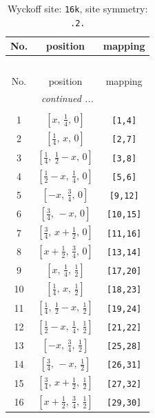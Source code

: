 \documentclass[fleqn,8pt]{jsarticle}
\begin{document}
\renewcommand{\arraystretch}{1.2}
\begin{longtable}{ccc}
\caption{Wyckoff site: {\tt 16k}, site symmetry: {\tt .2.}}
 \\
 \hline \hline
No. & position & mapping \\ \hline \endfirsthead

\multicolumn{2}{l}{\tablename\ \thetable{}} \\
 \hline \hline
No. & position & mapping \\ \hline \endhead

 \hline \hline
\multicolumn{2}{r}{\footnotesize\it continued ...} \\ \endfoot

 \hline \hline
\multicolumn{2}{r}{} \\ \endlastfoot

1 & $\left[ x,\, \frac{1}{4},\, 0 \right]$ & {\tt [1,4]} \\ \hline
2 & $\left[ \frac{1}{4},\, x,\, 0 \right]$ & {\tt [2,7]} \\ \hline
3 & $\left[ \frac{1}{4},\, \frac{1}{2} - x,\, 0 \right]$ & {\tt [3,8]} \\ \hline
4 & $\left[ \frac{1}{2} - x,\, \frac{1}{4},\, 0 \right]$ & {\tt [5,6]} \\ \hline
5 & $\left[ - x,\, \frac{3}{4},\, 0 \right]$ & {\tt [9,12]} \\ \hline
6 & $\left[ \frac{3}{4},\, - x,\, 0 \right]$ & {\tt [10,15]} \\ \hline
7 & $\left[ \frac{3}{4},\, x + \frac{1}{2},\, 0 \right]$ & {\tt [11,16]} \\ \hline
8 & $\left[ x + \frac{1}{2},\, \frac{3}{4},\, 0 \right]$ & {\tt [13,14]} \\ \hline
9 & $\left[ x,\, \frac{1}{4},\, \frac{1}{2} \right]$ & {\tt [17,20]} \\ \hline
10 & $\left[ \frac{1}{4},\, x,\, \frac{1}{2} \right]$ & {\tt [18,23]} \\ \hline
11 & $\left[ \frac{1}{4},\, \frac{1}{2} - x,\, \frac{1}{2} \right]$ & {\tt [19,24]} \\ \hline
12 & $\left[ \frac{1}{2} - x,\, \frac{1}{4},\, \frac{1}{2} \right]$ & {\tt [21,22]} \\ \hline
13 & $\left[ - x,\, \frac{3}{4},\, \frac{1}{2} \right]$ & {\tt [25,28]} \\ \hline
14 & $\left[ \frac{3}{4},\, - x,\, \frac{1}{2} \right]$ & {\tt [26,31]} \\ \hline
15 & $\left[ \frac{3}{4},\, x + \frac{1}{2},\, \frac{1}{2} \right]$ & {\tt [27,32]} \\ \hline
16 & $\left[ x + \frac{1}{2},\, \frac{3}{4},\, \frac{1}{2} \right]$ & {\tt [29,30]} \\
\end{longtable}
\end{document}

